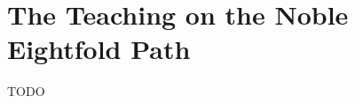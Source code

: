 
\chapter{The Teaching on the Noble Eightfold Path}%

\begin{leader}
\end{leader}

TODO

%
%
%
%
%
%
%
%
%
%
%
%
%
%
%
%
%
%
%
%

